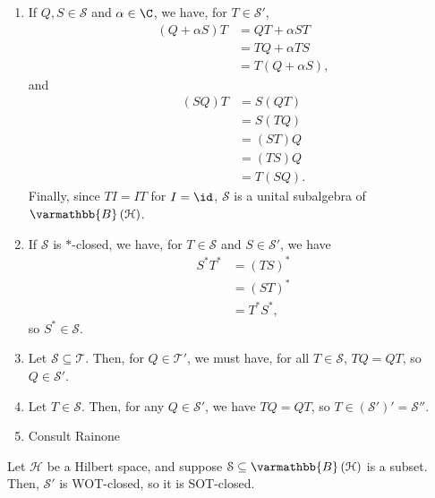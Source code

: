 \documentclass[10pt]{mypackage}
\renewcommand*{\mathbb}[1]{\varmathbb{#1}}
\newcommand{\B}{\mathbb{B}}
\begin{document}
\begin{solution}\hfill
  \begin{enumerate}[(1)]
    \item If $Q,S\in \mathcal{S}$ and $\alpha \in \C$, we have, for $T\in \mathcal{S}'$,
      \begin{align*}
        \left(Q + \alpha S\right)T &= QT + \alpha ST\\
                                   &= TQ + \alpha TS\\
                                   &= T\left(Q + \alpha S\right),
      \end{align*}
      and
      \begin{align*}
        \left(SQ\right)T &= S\left(QT\right)\\
                         &= S\left(TQ\right)\\
                         &= \left(ST\right)Q\\
                         &= \left(TS\right)Q\\
                         &= T\left(SQ\right).
      \end{align*}
      Finally, since $TI = IT$ for $I = \id$, $\mathcal{S}$ is a unital subalgebra of $\B\left(\mathcal{H}\right)$.
    \item If $\mathcal{S}$ is $\ast$-closed, we have, for $T\in \mathcal{S}$ and $S\in \mathcal{S}'$, we have
      \begin{align*}
        S^{\ast}T^{\ast} &= \left(TS\right)^{\ast}\\
                         &= \left(ST\right)^{\ast}\\
                         &= T^{\ast}S^{\ast},
      \end{align*}
      so $S^{\ast}\in \mathcal{S}$.
    \item Let $\mathcal{S}\subseteq \mathcal{T}$. Then, for $Q\in \mathcal{T}'$, we must have, for all $T\in \mathcal{S}$, $TQ = QT$, so $Q\in \mathcal{S}'$.
    \item Let $T\in \mathcal{S}$. Then, for any $Q\in \mathcal{S}'$, we have $TQ = QT$, so $T\in \left(\mathcal{S}'\right)'= \mathcal{S}''$.
    \item Consult Rainone
  \end{enumerate}
\end{solution}
\begin{lemma}
  Let $\mathcal{H}$ be a Hilbert space, and suppose $\mathcal{S}\subseteq \B\left(\mathcal{H}\right)$ is a subset. Then, $\mathcal{S}'$ is WOT-closed, so it is SOT-closed.
\end{lemma}
\end{document}
